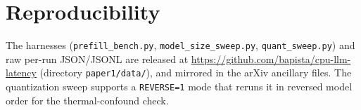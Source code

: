 \documentclass[10pt,twocolumn]{article}
\begin{document}
\section*{Reproducibility}
\label{sec:repro}
The harnesses (\texttt{prefill\_bench.py}, \texttt{model\_size\_sweep.py},
\texttt{quant\_sweep.py}) and raw per-run JSON/JSONL are released at
\url{https://github.com/bapista/cpu-llm-latency} (directory
\texttt{paper1/data/}), and mirrored in the arXiv ancillary files. The
quantization sweep supports a \texttt{REVERSE=1} mode that reruns it in
reversed model order for the thermal-confound check.



\end{document}
